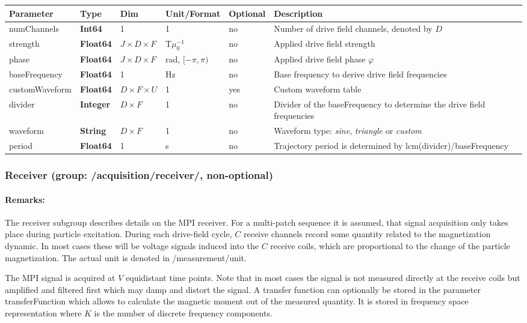 \documentclass[landscape,a4paper]{article} %
\newcommand{\inltab}[1]{{\ttfamily\bfseries\color{blue}#1}}
\newcommand{\inlvar}[1]{{\ttfamily#1}}
\begin{document}
\noindent \begin{tabularx}{\columnwidth}{lllllX} 
\textbf{Parameter} & \textbf{Type} & \textbf{Dim} & \textbf{Unit/Format} & \textbf{Optional} & \textbf{Description} \\ \hline 
\inlvar{numChannels} & \inltab{Int64} & 1 & 1 & no & Number of drive field channels, denoted by $D$ \\ \hline
\inlvar{strength} & \inltab{Float64} & $J \times D \times F $ & T$\mu_0^{-1}$ & no & Applied drive field strength \\ \hline
\inlvar{phase} & \inltab{Float64} & $J \times D \times F$ & rad, $[-\pi,\pi)$ & no & Applied drive field phase $\varphi$\\ \hline
\inlvar{baseFrequency} & \inltab{Float64} & 1 & Hz & no & Base frequency to derive drive field frequencies \\ \hline
\inlvar{customWaveform} & \inltab{Float64} & $D \times F \times U$ & 1 & yes & Custom waveform table \\ \hline
\inlvar{divider} & \inltab{Integer} & $D \times F$ & 1 & no & Divider of the \inlvar{baseFrequency} to determine the drive field frequencies \\ \hline
\inlvar{waveform} & \inltab{String} & $D \times F$ & 1 & no & Waveform type: \textit{sine}, \textit{triangle} or \textit{custom} \\ \hline
\inlvar{period} & \inltab{Float64} & 1 & s & no & Trajectory period is determined by lcm(\inlvar{divider})/\inlvar{baseFrequency}\\ \hline
\end{tabularx}


\subsubsection{Receiver (group: \inlvar{/acquisition/receiver/}, non-optional)}

\begin{multicols}{2}
\paragraph{Remarks:} The receiver subgroup describes details on the MPI receiver. For a multi-patch sequence it is assumed, that signal acquisition only takes place during particle excitation. During each drive-field cycle, $C$ receive channels record some quantity related to the magnetization dynamic. In most cases these will be voltage signals induced into the $C$ receive coils, which are proportional to the change of the particle magnetization. The actual unit is denoted in \inlvar{/measurement/unit}.

The MPI signal is acquired at $V$ equidistant time points. Note that in most cases the signal is not measured directly at the receive coils but amplified and filtered first which may damp and distort the signal. A transfer function can optionally be stored in the parameter \inlvar{transferFunction} which allows to calculate the magnetic moment out of the measured quantity. It is stored in frequency space representation where $K$ is the number of discrete frequency components.
\end{multicols}
\end{document}
